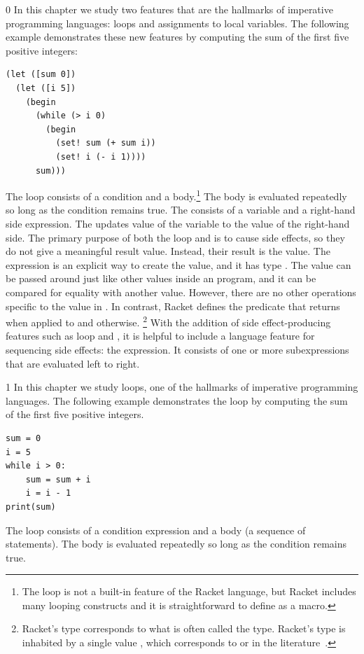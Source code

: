 \documentclass[7x10]{TimesAPriori_MIT}%
\def\racketEd{0}
\def\pythonEd{1}
\def\edition{1}
\newcommand{\pythonColor}[0]{}
\numberwithin{theorem}{chapter}
\numberwithin{definition}{chapter}
\numberwithin{equation}{chapter}
\begin{document}
{\if\edition\racketEd
%
In this chapter we study two features that are the hallmarks of
imperative programming languages: loops and assignments to local
variables. The following example demonstrates these new features by
computing the sum of the first five positive integers:
\begin{lstlisting}
(let ([sum 0])
  (let ([i 5])
    (begin
      (while (> i 0)
        (begin
          (set! sum (+ sum i))
          (set! i (- i 1))))
      sum)))
\end{lstlisting}
The  loop consists of a condition and a
body.\footnote{The  loop is not a built-in
feature of the Racket language, but Racket includes many looping
constructs and it is straightforward to define  as a
macro.} The body is evaluated repeatedly so long as the condition
remains true.
%
The  consists of a variable and a right-hand side
expression.  The  updates value of the variable to the
value of the right-hand side.
%
The primary purpose of both the  loop and  is
to cause side effects, so they do not give a meaningful result
value. Instead, their result is the  value.  The
expression  is an explicit way to create the
 value, and it has type .  The
 value can be passed around just like other values
inside an \LangLoop{} program, and it can be compared for equality with
another  value. However, there are no other operations
specific to the  value in \LangLoop{}. In contrast,
Racket defines the   predicate that returns 
when applied to  and  otherwise.%
%
\footnote{Racket's  type corresponds to what is often
  called the  type. Racket's  type is inhabited
  by a single value , which corresponds to 
  or \code{()} in the literature~\citep{Pierce:2002hj}.}
%
With the addition of side effect-producing features such as
 loop and , it is helpful to include a language
feature for sequencing side effects: the  expression. It
consists of one or more subexpressions that are evaluated
left to right.
%
\fi}

{\if\edition\pythonEd\pythonColor
%
In this chapter we study loops, one of the hallmarks of imperative
programming languages. The following example demonstrates the
 loop by computing the sum of the first five positive
integers.
\begin{lstlisting}
sum = 0
i = 5
while i > 0:
    sum = sum + i
    i = i - 1
print(sum)
\end{lstlisting}
The  loop consists of a condition expression and a body (a
sequence of statements). The body is evaluated repeatedly so long as
the condition remains true.
%
\fi}
\end{document}
